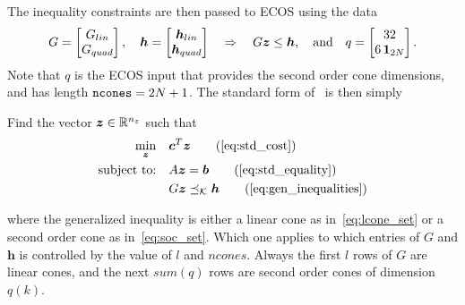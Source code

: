 \documentclass[10pt]{article}
\begin{document}
The inequality constraints are then passed to ECOS using the data
\begin{equation}
G = \begin{bmatrix}
G_{lin} \\ G_{quad}
\end{bmatrix}, \quad \bm{h} = \begin{bmatrix}
\bm{h}_{lin} \\ \bm{h}_{quad}
\end{bmatrix} \quad \Rightarrow \quad G \bm{z} \leq \bm{h}, \quad \text{and} \quad q = \begin{bmatrix}
32 \\ 6\,\bm{1}_{2N}
\end{bmatrix}.
\label{eq:gen_inequalities}
\end{equation}
Note that $q$ is the ECOS input that provides the second order cone dimensions, and has length $\texttt{ncones} = 2N+1$. The standard form of~ is then simply

\begin{problem}
Find the vector $\bm{z}\in{\mathbb{R}}^{n_z}$ such that
\begin{subequations}\label{eq:prob2}
\begin{align}
\min_{\bm{z}} &\quad \bm{c}^T \bm{z} \tag{\ref{eq:std_cost}}\\
\text{subject to:} &\quad A \bm{z} = \bm{b} \tag{\ref{eq:std_equality}} \\
&\quad G \bm{z} \preceq_{\mathcal{K}} \bm{h} \tag{\ref{eq:gen_inequalities}}
\end{align}
\end{subequations}
\end{problem}
where the generalized inequality is either a linear cone as in~\eqref{eq:lcone_set} or a second order cone as in~\eqref{eq:soc_set}. Which one applies to which entries of $G$ and $\bm{h}$ is controlled by the value of $l$ and $ncones$. Always the first $l$ rows of $G$ are linear cones, and the next $sum(q)$ rows are second order cones of dimension $q(k)$.




\end{document}
